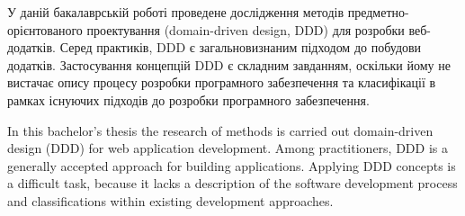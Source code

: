 
У даній бакалаврській роботі проведене дослідження методів
предметно-орієнтованого проектування (domain-driven design, DDD)
для розробки веб-додатків.
Серед практиків, DDD є загальновизнаним підходом до побудови додатків.
Застосування концепцій DDD є складним завданням,
оскільки йому не вистачає опису процесу розробки програмного забезпечення
та класифікації в рамках існуючих підходів до розробки
програмного забезпечення.
\clearpage


In this bachelor's thesis the research of methods is carried out
domain-driven design (DDD) for web application development.
Among practitioners, DDD is a generally accepted approach for building
applications.
Applying DDD concepts is a difficult task,
because it lacks a description of the software development process
and classifications within existing development approaches.

\clearpage
